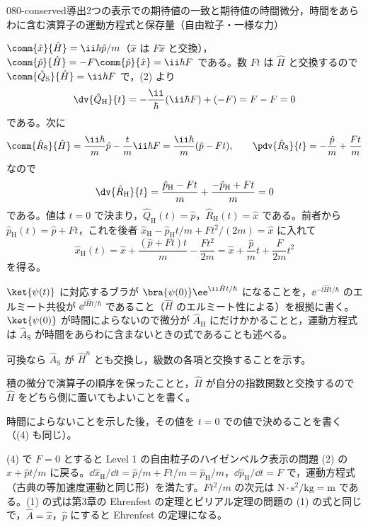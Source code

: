 \documentclass[uplatex,dvipdfmx,a4paper,11pt]{jsarticle}
\begin{document}
\begin{mondai}{080-conserved}{導出}{2つの表示での期待値の一致と期待値の時間微分，時間をあらわに含む演算子の運動方程式と保存量（自由粒子・一様な力）}
\begin{tadashii}
 $\comm{\hat{x}}{\hat{H}}=\ii\hbar\hat{p}/m$（$\hat{x}$ は $F\hat{x}$ と交換），$\comm{\hat{p}}{\hat{H}}=-F\comm{\hat{p}}{\hat{x}}=\ii\hbar F$ である。数 $Ft$ は $\hat{H}$ と交換するので $\comm{\hat{Q}_{\mathrm{S}}}{\hat{H}}=\ii\hbar F$ で，(2) より
\[ \dv{\hat{Q}_{\mathrm{H}}}{t}=-\frac{\ii}{\hbar}(\ii\hbar F)+(-F)=F-F=0 \]
である。次に
\[ \comm{\hat{R}_{\mathrm{S}}}{\hat{H}}=\frac{\ii\hbar}{m}\hat{p}-\frac{t}{m}\ii\hbar F=\frac{\ii\hbar}{m}(\hat{p}-Ft),\qquad \pdv{\hat{R}_{\mathrm{S}}}{t}=-\frac{\hat{p}}{m}+\frac{Ft}{m} \]
なので
\[ \dv{\hat{R}_{\mathrm{H}}}{t}=\frac{\hat{p}_{\mathrm{H}}-Ft}{m}+\frac{-\hat{p}_{\mathrm{H}}+Ft}{m}=0 \]
である。値は $t=0$ で決まり，$\hat{Q}_{\mathrm{H}}(t)=\hat{p}$，$\hat{R}_{\mathrm{H}}(t)=\hat{x}$ である。前者から $\hat{p}_{\mathrm{H}}(t)=\hat{p}+Ft$，これを後者 $\hat{x}_{\mathrm{H}}-\hat{p}_{\mathrm{H}}t/m+Ft^{2}/(2m)=\hat{x}$ に入れて
\[ \hat{x}_{\mathrm{H}}(t)=\hat{x}+\frac{(\hat{p}+Ft)t}{m}-\frac{Ft^{2}}{2m}=\hat{x}+\frac{\hat{p}}{m}t+\frac{F}{2m}t^{2} \]
を得る。
\begin{ronten}
  \item {} $\ket{\psi(t)}$ に対応するブラが $\bra{\psi(0)}\ee^{\ii\hat{H}t/\hbar}$ になることを，$\ee^{-\ii\hat{H}t/\hbar}$ のエルミート共役が $\ee^{\ii\hat{H}t/\hbar}$ であること（$\hat{H}$ のエルミート性による）を根拠に書く。$\ket{\psi(0)}$ が時間によらないので微分が $\hat{A}_{\mathrm{H}}$ にだけかかることと，運動方程式は $\hat{A}_{\mathrm{S}}$ が時間をあらわに含まないときの式であることも述べる。
  \item {} 可換なら $\hat{A}_{\mathrm{S}}$ が $\hat{H}^{n}$ とも交換し，級数の各項と交換することを示す。
  \item {} 積の微分で演算子の順序を保ったことと，$\hat{H}$ が自分の指数関数と交換するので $\hat{H}$ をどちら側に置いてもよいことを書く。
  \item {} 時間によらないことを示した後，その値を $t=0$ での値で決めることを書く（(4) も同じ）。
\end{ronten}
\kenzan (4) で $F=0$ とすると Level 1 の自由粒子のハイゼンベルク表示の問題 (2) の $\hat{x}+\hat{p}t/m$ に戻る。$\dd\hat{x}_{\mathrm{H}}/\dd t=\hat{p}/m+Ft/m=\hat{p}_{\mathrm{H}}/m$，$\dd\hat{p}_{\mathrm{H}}/\dd t=F$ で，運動方程式（古典の等加速度運動と同じ形）を満たす。$Ft^{2}/m$ の次元は $\unit{\newton}\cdot\unit{\second\squared}/\unit{\kilogram}=\unit{\metre}$ である。(1) の式は第3章の Ehrenfest の定理とビリアル定理の問題の (1) の式と同じで，$\hat{A}=\hat{x}$，$\hat{p}$ にすると Ehrenfest の定理になる。

\end{tadashii}
\end{mondai}
\end{document}

